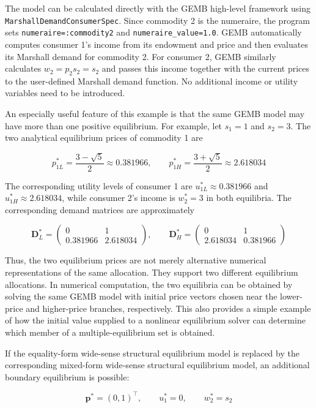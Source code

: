 \documentclass[
  letterpaper,
  DIV=11,
  numbers=noendperiod]{scrreprt}
\begin{document}
The model can be calculated directly with the GEMB high-level framework
using \texttt{MarshallDemandConsumerSpec}. Since commodity 2 is the
numeraire, the program sets \texttt{numeraire=:commodity2} and
\texttt{numeraire\_value=1.0}. GEMB automatically computes consumer 1's
income from its endowment and price and then evaluates its Marshall
demand for commodity 2. For consumer 2, GEMB similarly calculates
\(w_2=p_2s_2=s_2\) and passes this income together with the current
prices to the user-defined Marshall demand function. No additional
income or utility variables need to be introduced.

An especially useful feature of this example is that the same GEMB model
may have more than one positive equilibrium. For example, let \(s_1=1\)
and \(s_2=3\). The two analytical equilibrium prices of commodity 1 are

\[
p_{1L}^*=\frac{3-\sqrt5}{2}\approx0.381966,
\qquad
p_{1H}^*=\frac{3+\sqrt5}{2}\approx2.618034
\]

The corresponding utility levels of consumer 1 are
\(u_{1L}^*\approx0.381966\) and \(u_{1H}^*\approx2.618034\), while
consumer 2's income is \(w_2^*=3\) in both equilibria. The corresponding
demand matrices are approximately

\[
\mathbf D_L^*=
\begin{pmatrix}
0&1\\
0.381966&2.618034
\end{pmatrix},
\qquad
\mathbf D_H^*=
\begin{pmatrix}
0&1\\
2.618034&0.381966
\end{pmatrix}
\]

Thus, the two equilibrium prices are not merely alternative numerical
representations of the same allocation. They support two different
equilibrium allocations. In numerical computation, the two equilibria
can be obtained by solving the same GEMB model with initial price
vectors chosen near the lower-price and higher-price branches,
respectively. This also provides a simple example of how the initial
value supplied to a nonlinear equilibrium solver can determine which
member of a multiple-equilibrium set is obtained.

If the equality-form wide-sense structural equilibrium model is replaced
by the corresponding mixed-form wide-sense structural equilibrium model,
an additional boundary equilibrium is possible:

\[
\mathbf p^*=(0,1)^\top,\qquad
u_1^*=0,\qquad
w_2^*=s_2
\]
\end{document}
